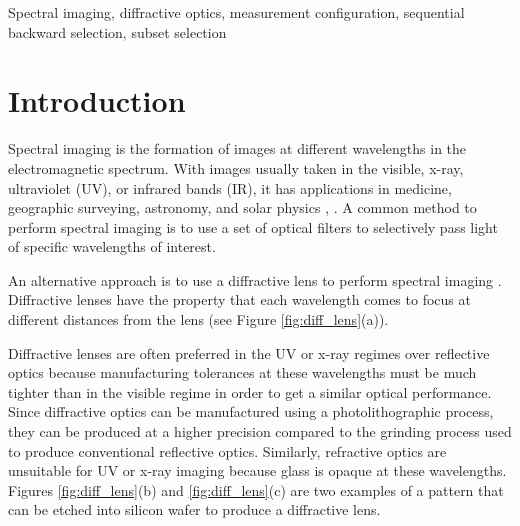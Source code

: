 \documentclass{article}
\begin{document}
\begin{keywords}
Spectral imaging, diffractive optics, measurement configuration, sequential
backward selection, subset selection
\end{keywords}

\section{Introduction}
\label{sec:intro}
Spectral imaging is the formation of images at different wavelengths in the
electromagnetic spectrum.  With images usually taken in the visible, x-ray,
ultraviolet (UV), or infrared bands (IR), it has applications in medicine,
geographic surveying, astronomy, and solar physics \cite{shaw2003spectral},
\cite{garini2006spectral}. A common method to perform spectral imaging is to use
a set of optical filters to selectively pass light of specific wavelengths of
interest.


An alternative approach is to use a diffractive lens to perform spectral imaging
\cite{oktem2014icip}. Diffractive lenses have the property that each wavelength
comes to focus at different distances from the lens (see Figure \ref{fig:diff_lens}(a)).

Diffractive lenses are often preferred in the UV or x-ray regimes over
reflective optics because manufacturing tolerances at these wavelengths must be
much tighter than in the visible regime in order to get a similar optical
performance. Since diffractive optics can be manufactured using a
photolithographic process, they can be produced at a higher precision compared
to the grinding process used to produce conventional reflective optics.
Similarly, refractive optics are unsuitable for UV or x-ray imaging because
glass is opaque at these wavelengths. Figures \ref{fig:diff_lens}(b) and
\ref{fig:diff_lens}(c) are two examples of a pattern that can be etched into
silicon wafer to produce a diffractive lens.
\end{document}
